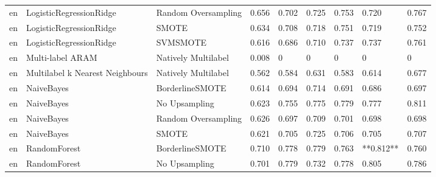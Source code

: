 \begin{tabular}{lllllllll}
      en &         LogisticRegressionRidge &           Random Oversampling & 0.656 &                     0.702 &                 0.725 &                  0.753 &                                   0.720 &     0.767 \\
      en &         LogisticRegressionRidge &                         SMOTE & 0.634 &                     0.708 &                 0.718 &                  0.751 &                                   0.719 &     0.752 \\
      en &         LogisticRegressionRidge &                      SVMSMOTE & 0.616 &                     0.686 &                 0.710 &                  0.737 &                                   0.737 &     0.761 \\
      en &                Multi-label ARAM &           Natively Multilabel & 0.008 &                         0 &                     0 &                      0 &                                       0 &         0 \\
      en & Multilabel k Nearest Neighbours &           Natively Multilabel & 0.562 &                     0.584 &                 0.631 &                  0.583 &                                   0.614 &     0.677 \\
      en &                      NaiveBayes &               BorderlineSMOTE & 0.614 &                     0.694 &                 0.714 &                  0.691 &                                   0.686 &     0.697 \\
      en &                      NaiveBayes &                 No Upsampling & 0.623 &                     0.755 &                 0.775 &                  0.779 &                                   0.777 &     0.811 \\
      en &                      NaiveBayes &           Random Oversampling & 0.626 &                     0.697 &                 0.709 &                  0.701 &                                   0.698 &     0.698 \\
      en &                      NaiveBayes &                         SMOTE & 0.621 &                     0.705 &                 0.725 &                  0.706 &                                   0.705 &     0.707 \\
      en &                    RandomForest &               BorderlineSMOTE & 0.710 &                     0.778 &                 0.779 &                  0.763 &                               **0.812** &     0.760 \\
      en &                    RandomForest &                 No Upsampling & 0.701 &                     0.779 &                 0.732 &                  0.778 &                                   0.805 &     0.786 \\

\end{tabular}

